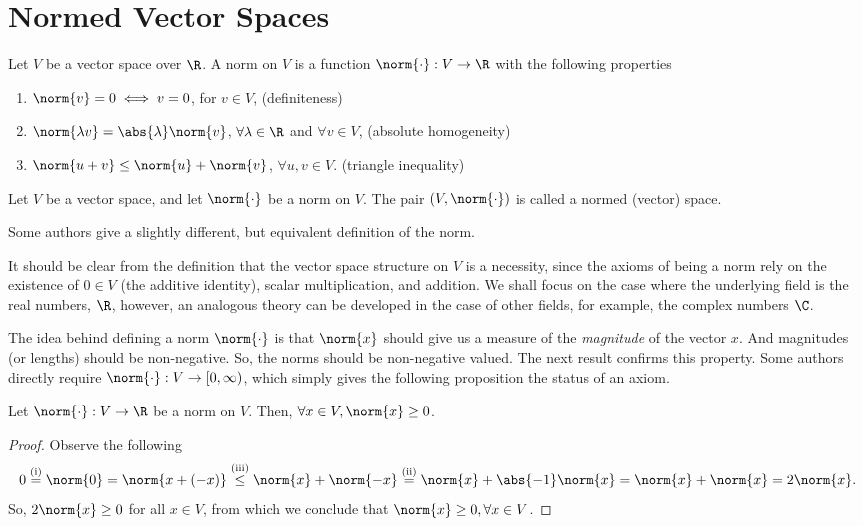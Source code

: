 \section{Normed Vector Spaces}
\begin{ndfn}[Norm]
  Let $V$ be a vector space over $\R$. A norm on $V$ is a function $\norm{\cdot}:V\to\R$ with the following properties
  \begin{enumerate}
  \item $\norm{v} = 0 \iff v =0$, for $v \in V$, \hfill (definiteness)
  \item $\norm{\lambda v} = \abs{\lambda}\norm{v}$, $\forall \lambda \in \R$ and $\forall v \in V$, \hfill (absolute homogeneity)
  \item $\norm{u+v} \leq \norm{u} + \norm{v}$, $\forall u,v \in V$. \hfill (triangle inequality)
  \end{enumerate}
\end{ndfn}

\begin{ndfn}
  Let $V$ be a vector space, and let $\norm{\cdot}$ be a norm on $V$. The pair $(V, \norm{\cdot})$ is called a normed (vector) space.
\end{ndfn}

Some authors give a slightly different, but equivalent definition of the norm.

It should be clear from the definition that the vector space structure on $V$ is a necessity, since the axioms of being a norm rely on the existence of $0 \in V$ (the additive identity), scalar multiplication, and addition. We shall focus on the case where the underlying field is the real numbers, $\R$, however, an analogous theory can be developed in the case of other fields, for example, the complex numbers $\C$.

The idea behind defining a norm $\norm{\cdot}$ is that $\norm{x}$ should give us a measure of the \emph{magnitude} of the vector $x$. And magnitudes (or lengths) should be non-negative. So, the norms should be non-negative valued. The next result confirms this property. Some authors directly require $\norm{\cdot}:V\to[0,\infty)$, which simply gives the following proposition the status of an axiom.

\begin{nprop}
  Let $\norm{\cdot}:V\to\R$ be a norm on $V$. Then, $\forall x \in V, \norm{x} \geq 0$.
\end{nprop}
\begin{proof}
  Observe the following
  \begin{equation*}
    0
    \overset{\text{(i)}}{=} \norm{0}
    = \norm{x+(-x)}
    \overset{\text{(iii)}}{\leq} \norm{x} + \norm{-x}
    \overset{\text{(ii)}}{=} \norm{x} + \abs{-1}\norm{x}
    = \norm{x} + \norm{x}
    = 2\norm{x}.
  \end{equation*}
  So, $2\norm{x} \geq 0$ for all $x \in V$, from which we conclude that $\norm{x} \geq 0, \forall x \in V$.
\end{proof}

